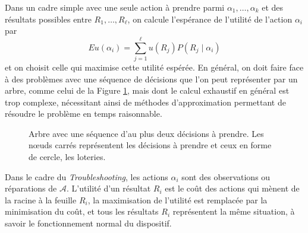 \documentclass[a4paper,11pt]{article}
\theoremstyle{plain}
\begin{document}
Dans un cadre simple avec une seule action à prendre parmi $\alpha_1, \dotsc, \alpha_k$ et des résultats possibles entre $R_1, \dotsc, R_\ell$, on calcule l'espérance de l'utilité de l'action $\alpha_i$ par \[Eu(\alpha_i) = \sum_{j = 1}^\ell u(R_j)P(R_j\mid\alpha_i)\] et on choisit celle qui maximise cette utilité espérée. En général, on doit faire face à des problèmes avec une séquence de décisions que l'on peut représenter par un arbre, comme celui de la Figure \ref{arbre}, mais dont le calcul exhaustif en général est trop complexe, nécessitant ainsi de méthodes d'approximation permettant de résoudre le problème en temps raisonnable.

\begin{figure}[ht]
\centering
{}
\caption{Arbre avec une séquence d'au plus deux décisions à prendre. Les nœuds carrés représentent les décisions à prendre et ceux en forme de cercle, les loteries.}
\label{arbre}
\end{figure}

Dans le cadre du \emph{Troubleshooting}, les actions $\alpha_i$ sont des observations ou réparations de $\mathcal A$. L'utilité d'un résultat $R_i$ est le coût des actions qui mènent de la racine à la feuille $R_i$, la maximisation de l'utilité est remplacée par la minimisation du coût, et tous les résultats $R_i$ représentent la même situation, à savoir le fonctionnement normal du dispositif.
\end{document}
